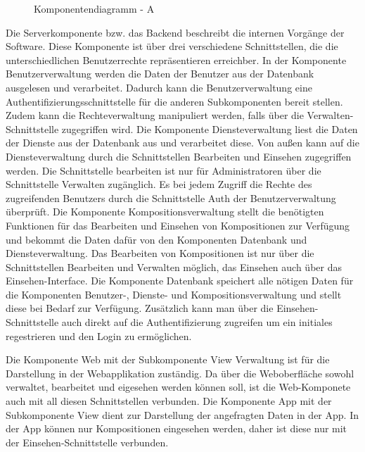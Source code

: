 \begin{figure}[h]
	\centering
	\caption{Komponentendiagramm - A}
	\label{fig:komponentendiagramm-a}
\end{figure}

Die Serverkomponente bzw. das Backend beschreibt die internen Vorgänge der Software.
Diese Komponente ist über drei verschiedene Schnittstellen, die die unterschiedlichen
Benutzerrechte repräsentieren erreichber.
In der Komponente Benutzerverwaltung werden die Daten der Benutzer aus der Datenbank ausgelesen und verarbeitet.
Dadurch kann die Benutzerverwaltung eine Authentifizierungsschnittstelle für die anderen Subkomponenten bereit stellen.
Zudem kann die Rechteverwaltung manipuliert werden, falls über die Verwalten-Schnittstelle zugegriffen wird.
Die Komponente Diensteverwaltung liest die Daten der Dienste aus der Datenbank aus und verarbeitet diese.
Von außen kann auf die Diensteverwaltung durch die Schnittstellen Bearbeiten und Einsehen zugegriffen werden.
Die Schnittstelle bearbeiten ist nur für Administratoren über die Schnittstelle Verwalten zugänglich.
Es bei jedem Zugriff die Rechte des zugreifenden Benutzers durch die Schnittstelle Auth der Benutzerverwaltung überprüft.
Die Komponente Kompositionsverwaltung stellt die benötigten Funktionen für das Bearbeiten und Einsehen von Kompositionen zur Verfügung und bekommt die Daten dafür von den Komponenten Datenbank und Diensteverwaltung.
Das Bearbeiten von Kompositionen ist nur über die Schnittstellen Bearbeiten und Verwalten möglich, das Einsehen auch über das Einsehen-Interface.
Die Komponente Datenbank speichert alle nötigen Daten für die Komponenten Benutzer-, Dienste- und Kompositionsverwaltung und stellt diese bei Bedarf zur Verfügung.
Zusätzlich kann man über die Einsehen-Schnittstelle auch direkt auf die Authentifizierung zugreifen um ein initiales regestrieren und den Login zu ermöglichen.

Die Komponente Web mit der Subkomponente View Verwaltung ist für die Darstellung in der Webapplikation zuständig.
Da über die Weboberfläche sowohl verwaltet, bearbeitet und eigesehen werden können soll, ist die Web-Komponete auch mit all diesen Schnittstellen verbunden.
Die Komponente App mit der Subkomponente View dient zur Darstellung der angefragten Daten in der App.
In der App können nur Kompositionen eingesehen werden, daher ist diese nur mit der Einsehen-Schnittstelle verbunden.
